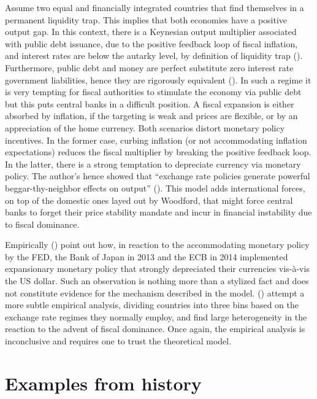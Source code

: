 \documentclass[american]{scrartcl}
\newcommand{\citein}[1]{\citeauthor{#1} (\citeyear{#1})}
\begin{document}
Assume two equal and financially integrated countries that find themselves in a permanent liquidity trap. This implies that both economies have a positive output gap. In this context, there is a Keynesian output multiplier associated with public debt issuance, due to the positive feedback loop of fiscal inflation, and interest rates are below the autarky level, by definition of liquidity trap (\cite[p. 41]{Caballero2016}). Furthermore, public debt and money are perfect substitute zero interest rate government liabilities, hence they are rigorously equivalent (\cite[p. 42]{Caballero2016}). In such a regime it is very tempting for fiscal authorities to stimulate the economy via public debt but this puts central banks in a difficult position. A fiscal expansion is either absorbed by inflation, if the targeting is weak and prices are flexible, or by an appreciation of the home currency. Both scenarios distort monetary policy incentives. In the former case, curbing inflation (or not accommodating inflation expectations) reduces the fiscal multiplier by breaking the positive feedback loop. In the latter, there is a strong temptation to depreciate currency via monetary policy. The author's hence showed that ``exchange rate policies generate powerful beggar-thy-neighbor effects on output'' (\cite[p. 32]{Caballero2016}). This model adds international forces, on top of the domestic ones layed out by Woodford, that might force central banks to forget their price stability mandate and incur in financial instability due to fiscal dominance.

Empirically \citein{Caballero2016} point out how, in reaction to the accommodating monetary policy by the FED, the Bank of Japan in 2013 and the ECB in 2014 implemented expansionary monetary policy that strongly depreciated their currencies vis-à-vis the US dollar. Such an observation is nothing more than a stylized fact and does not constitute evidence for the mechanism described in the model. \citein{Ahmed2021} attempt a more subtle empirical analysis, dividing countries into three bins based on the exchange rate regimes they normally employ, and find large heterogeneity in the reaction to the advent of fiscal dominance. Once again, the empirical analysis is inconclusive and requires one to trust the theoretical model.

\section{Examples from history}
\end{document}
